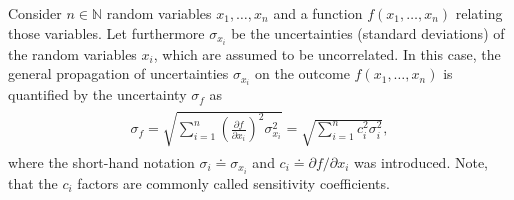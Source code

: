 \documentclass[a4paper,10pt, twocolumn]{article}
\begin{document}
Consider $n \in \mathbb{N}$ random variables $x_1,\dots,x_n$ and a function $f(x_1,\dots,x_n)$ relating those variables. Let furthermore $\sigma_{x_i}$ be the uncertainties (standard deviations) of the random variables $x_i$, which are assumed to be uncorrelated. In this case, the general propagation of uncertainties $\sigma_{x_i}$ on the outcome $f(x_1,\dots,x_n)$ is quantified by the uncertainty $\sigma_f$ as \begin{gather}\label{eq:generallawpropagationofuncertainties}
		\begin{gathered}\sigma_f = \sqrt{\sum_{i=1}^{n}\left(\frac{\partial f}{\partial x_i}\right)^2 \sigma_{x_i}^2} = \sqrt{\sum_{i=1}^{n}c_i^2 \sigma_{i}^2},
\end{gathered}\end{gather} where the short-hand notation $\sigma_i \doteq \sigma_{x_i}$ and $c_i \doteq \partial f/\partial x_i$ was introduced. Note, that the $c_i$ factors are commonly called sensitivity coefficients.





\end{document}
